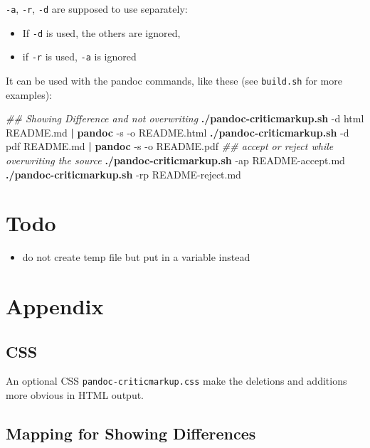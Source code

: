\documentclass[]{article}
\newenvironment{Shaded}{}{}
\newcommand{\KeywordTok}[1]{\textcolor[rgb]{0.00,0.44,0.13}{\textbf{{#1}}}}
\newcommand{\CommentTok}[1]{\textcolor[rgb]{0.38,0.63,0.69}{\textit{{#1}}}}
\newcommand{\NormalTok}[1]{{#1}}
\providecommand{\tightlist}{%
  \setlength{\itemsep}{0pt}\setlength{\parskip}{0pt}}
\begin{document}
\texttt{-a}, \texttt{-r}, \texttt{-d} are supposed to use separately:

\begin{itemize}
\tightlist
\item
  If \texttt{-d} is used, the others are ignored,
\item
  if \texttt{-r} is used, \texttt{-a} is ignored
\end{itemize}

It can be used with the pandoc commands, like these (see
\texttt{build.sh} for more examples):

\begin{Shaded}
\begin{Highlighting}[]
\CommentTok{## Showing Difference and not overwriting}
\KeywordTok{./pandoc-criticmarkup.sh} \NormalTok{-d html README.md }\KeywordTok{|} \KeywordTok{pandoc} \NormalTok{-s -o README.html}
\KeywordTok{./pandoc-criticmarkup.sh} \NormalTok{-d pdf README.md }\KeywordTok{|} \KeywordTok{pandoc} \NormalTok{-s -o README.pdf}
\CommentTok{## accept or reject while overwriting the source}
\KeywordTok{./pandoc-criticmarkup.sh} \NormalTok{-ap README-accept.md}
\KeywordTok{./pandoc-criticmarkup.sh} \NormalTok{-rp README-reject.md}
\end{Highlighting}
\end{Shaded}

\section{Todo}\label{todo}

\begin{itemize}
\tightlist
\item
  do not create temp file but put in a variable instead
\end{itemize}

\section{Appendix}\label{appendix}

\subsection{CSS}\label{css}

An optional CSS \texttt{pandoc-criticmarkup.css} make the deletions and
additions more obvious in HTML output.

\subsection{Mapping for Showing
Differences}\label{mapping-for-showing-differences}
\end{document}
